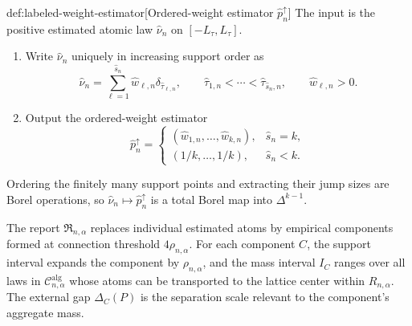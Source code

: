 \begin{algorithmv}{def:labeled-weight-estimator}[Ordered-weight estimator \(\widehat p_n^{\uparrow}\)]
The input is the positive estimated atomic law \(\widehat\nu_n\) on \([-L_\tau,L_\tau]\).

\begin{enumerate}
\item Write \(\widehat\nu_n\) uniquely in increasing support order as
\[
\widehat\nu_n
=
\sum_{\ell=1}^{\widehat s_n}
\widehat w_{\ell,n}\delta_{\widehat\tau_{\ell,n}},
\qquad
\widehat\tau_{1,n}<\cdots<\widehat\tau_{\widehat s_n,n},
\qquad
\widehat w_{\ell,n}>0 .
\]

\item Output the ordered-weight estimator
\[
\widehat p_n^{\uparrow}
=
\begin{cases}
(\widehat w_{1,n},\ldots,\widehat w_{k,n}), & \widehat s_n=k,\\[2mm]
(1/k,\ldots,1/k), & \widehat s_n<k .
\end{cases}
\]
\end{enumerate}

Ordering the finitely many support points and extracting their jump sizes are Borel operations, so \(\widehat\nu_n\mapsto\widehat p_n^{\uparrow}\) is a total Borel map into \(\Delta^{k-1}\).
\end{algorithmv}

The report \(\mathfrak R_{n,\alpha}\) replaces individual estimated atoms by empirical components formed at connection threshold \(4\rho_{n,\alpha}\). For each component \(C\), the support interval expands the component by \(\rho_{n,\alpha}\), and the mass interval \(I_C\) ranges over all laws in \(\mathcal C^{\mathrm{alg}}_{n,\alpha}\) whose atoms can be transported to the lattice center within \(R_{n,\alpha}\). The external gap \(\Delta_C(P)\) is the separation scale relevant to the component's aggregate mass.

